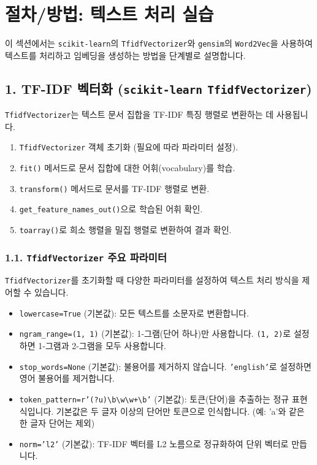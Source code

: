 \documentclass[11pt,a4paper]{article}
\begin{document}
\newpage
\section*{절차/방법: 텍스트 처리 실습}

이 섹션에서는 \texttt{scikit-learn}의 \texttt{TfidfVectorizer}와 \texttt{gensim}의 \texttt{Word2Vec}을 사용하여 텍스트를 처리하고 임베딩을 생성하는 방법을 단계별로 설명합니다.

\subsection*{1. TF-IDF 벡터화 (\texttt{scikit-learn} \texttt{TfidfVectorizer})}
\texttt{TfidfVectorizer}는 텍스트 문서 집합을 TF-IDF 특징 행렬로 변환하는 데 사용됩니다.

\begin{tcolorbox}[examplebox, title=TF-IDF 벡터화 기본 절차]
\begin{enumerate}
    \item \texttt{TfidfVectorizer} 객체 초기화 (필요에 따라 파라미터 설정).
    \item \texttt{fit()} 메서드로 문서 집합에 대한 어휘(vocabulary)를 학습.
    \item \texttt{transform()} 메서드로 문서를 TF-IDF 행렬로 변환.
    \item \texttt{get\_feature\_names\_out()}으로 학습된 어휘 확인.
    \item \texttt{toarray()}로 희소 행렬을 밀집 행렬로 변환하여 결과 확인.
\end{enumerate}
\end{tcolorbox}

\subsubsection*{1.1. \texttt{TfidfVectorizer} 주요 파라미터}
\texttt{TfidfVectorizer}를 초기화할 때 다양한 파라미터를 설정하여 텍스트 처리 방식을 제어할 수 있습니다.

\begin{itemize}
    \item \texttt{lowercase=True} (기본값): 모든 텍스트를 소문자로 변환합니다.
    \item \texttt{ngram\_range=(1, 1)} (기본값): 1-그램(단어 하나)만 사용합니다. \texttt{(1, 2)}로 설정하면 1-그램과 2-그램을 모두 사용합니다.
    \item \texttt{stop\_words=None} (기본값): 불용어를 제거하지 않습니다. \texttt{'english'}로 설정하면 영어 불용어를 제거합니다.
    \item \texttt{token\_pattern=r'(?u)\textbackslash{}b\textbackslash{}w\textbackslash{w}+\textbackslash{}b'} (기본값): 토큰(단어)을 추출하는 정규 표현식입니다. 기본값은 두 글자 이상의 단어만 토큰으로 인식합니다. (예: 'a'와 같은 한 글자 단어는 제외)
    \item \texttt{norm='l2'} (기본값): TF-IDF 벡터를 L2 노름으로 정규화하여 단위 벡터로 만듭니다.
\end{itemize}
\end{document}
